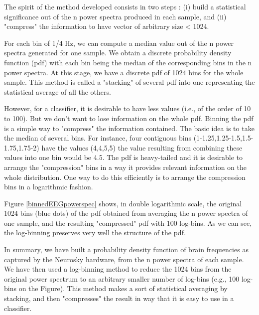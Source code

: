 The spirit of the method developed consists in two steps : (i) build a statistical significance out of the n power spectra produced in each sample, and (ii) "compress" the information to have vector of arbitrary size < 1024.

For each bin of 1/4 Hz, we can compute a median value out of the n power spectra generated for one sample.  We obtain a discrete probability density function (pdf) with each bin being the median of the corresponding bins in the n power spectra. At this stage, we have a discrete pdf of 1024 bins for the whole sample. This method is called a "stacking" of several pdf into one representing the statistical average of all the others.

However, for a classifier, it is desirable to have less values (i.e., of the order of 10 to 100). But we don't want to lose information on the whole pdf. Binning the pdf is a simple way to "compress" the information contained. The basic idea is to take the median of several bins. For instance, four contiguous bins (1-1.25,1.25-1.5,1.5-1.75,1.75-2) have the values (4,4,5,5) the value resulting from combining these values into one bin would be 4.5. The pdf is heavy-tailed and it is desirable to arrange the "compression" bins in a way it provides relevant information on the whole distribution. One way to do this efficiently is to arrange the compression bins in a logarithmic fashion.


Figure \ref{binnedEEGpowerspec} shows, in double logarithmic scale, the original 1024 bins (blue dots) of the pdf obtained from averaging the n power spectra of one sample, and the resulting "compressed"  pdf with 100 log-bins. As we can see, the log-binning preserves very well the structure of the pdf.

In summary, we have built a probability density function of brain frequencies as captured by the Neurosky hardware, from the n power spectra of each sample. We have then used a log-binning method to reduce the 1024 bins from the original power spectrum to an arbitrary smaller number of log-bins (e.g., 100 log-bins on the Figure). This method makes a sort of statistical averaging by stacking, and then "compresses" the result in way that it is easy to use in a classifier.

